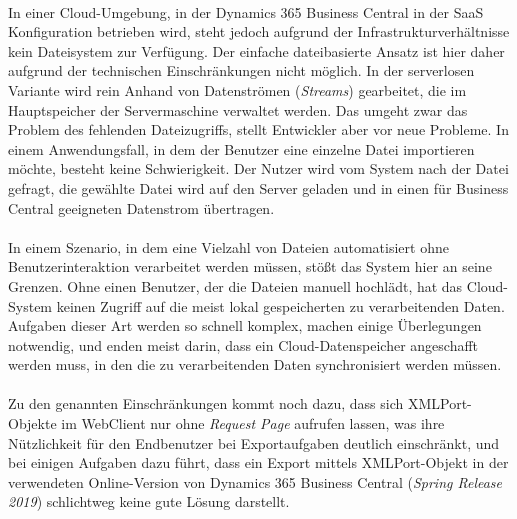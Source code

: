 \paragraph{}
In einer Cloud-Umgebung, in der Dynamics 365 Business Central in der SaaS Konfiguration betrieben wird, steht jedoch aufgrund der Infrastrukturverhältnisse kein Dateisystem zur Verfügung. Der einfache dateibasierte Ansatz ist hier daher aufgrund der technischen Einschränkungen nicht möglich. In der serverlosen Variante wird rein Anhand von Datenströmen (\textit{Streams}) gearbeitet, die im Hauptspeicher der Servermaschine verwaltet werden. 
Das umgeht zwar das Problem des fehlenden Dateizugriffs, stellt Entwickler aber vor neue Probleme. In einem Anwendungsfall, in dem der Benutzer eine einzelne Datei importieren möchte, besteht keine Schwierigkeit. Der Nutzer wird vom System nach der Datei gefragt, die gewählte Datei wird auf den Server geladen und in einen für Business Central geeigneten Datenstrom übertragen. 

\paragraph{}
In einem Szenario, in dem eine Vielzahl von Dateien automatisiert ohne Benutzerinteraktion verarbeitet werden müssen, stößt das System hier an seine Grenzen. Ohne einen Benutzer, der die Dateien manuell hochlädt, hat das Cloud-System keinen Zugriff auf die meist lokal gespeicherten zu verarbeitenden Daten. Aufgaben dieser Art werden so schnell komplex, machen einige Überlegungen notwendig, und enden meist darin, dass ein Cloud-Datenspeicher angeschafft werden muss, in den die zu verarbeitenden Daten synchronisiert werden müssen. 

\paragraph{}
Zu den genannten Einschränkungen kommt noch dazu, dass sich XMLPort-Objekte im WebClient nur ohne \textit{Request Page} aufrufen lassen, was ihre Nützlichkeit für den Endbenutzer bei Exportaufgaben deutlich einschränkt, und bei einigen Aufgaben dazu führt, dass ein Export mittels XMLPort-Objekt in der verwendeten Online-Version von Dynamics 365 Business Central (\textit{Spring Release 2019}) schlichtweg keine gute Lösung darstellt.
\pagebreak

